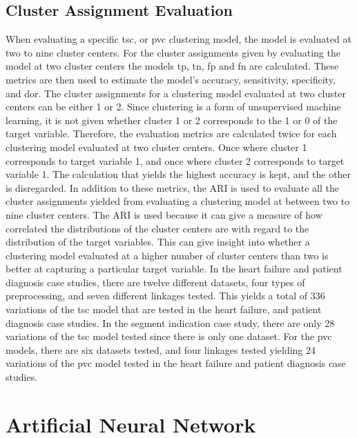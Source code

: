 \subsection{Cluster Assignment Evaluation}

When evaluating a specific \acrshort{tsc}, or \acrshort{pvc} clustering model, the model is evaluated at two to nine cluster centers. For the cluster assignments given by evaluating the model at two cluster centers the models \acrshort{tp}, \acrshort{tn}, \acrshort{fp} and \acrshort{fn} are calculated. These metrics are then used to estimate the model's accuracy, sensitivity, specificity, and \acrshort{dor}. The cluster assignments for a clustering model evaluated at two cluster centers can be either 1 or 2. Since clustering is a form of unsupervised machine learning, it is not given whether cluster 1 or 2 corresponds to the 1 or 0 of the target variable. Therefore, the evaluation metrics are calculated twice for each clustering model evaluated at two cluster centers. Once where cluster 1 corresponds to target variable 1, and once where cluster 2 corresponds to target variable 1. The calculation that yields the highest accuracy is kept, and the other is disregarded. In addition to these metrics, the ARI is used to evaluate all the cluster assignments yielded from evaluating a clustering model at between two to nine cluster centers. The ARI is used because it can give a measure of how correlated the distributions of the cluster centers are with regard to the distribution of the target variables. This can give insight into whether a clustering model evaluated at a higher number of cluster centers than two is better at capturing a particular target variable. In the heart failure and patient diagnosis case studies, there are twelve different datasets, four types of preprocessing, and seven different linkages tested. This yields a total of 336 variations of the \acrshort{tsc} model that are tested in the heart failure, and patient diagnosis case studies. In the segment indication case study, there are only 28 variations of the \acrshort{tsc} model tested since there is only one dataset. For the \acrshort{pvc} models, there are six datasets tested, and four linkages tested yielding 24 variations of the \acrshort{pvc} model tested in the heart failure and patient diagnosis case studies.

\section{Artificial Neural Network} \label{sec:meth_nn}

